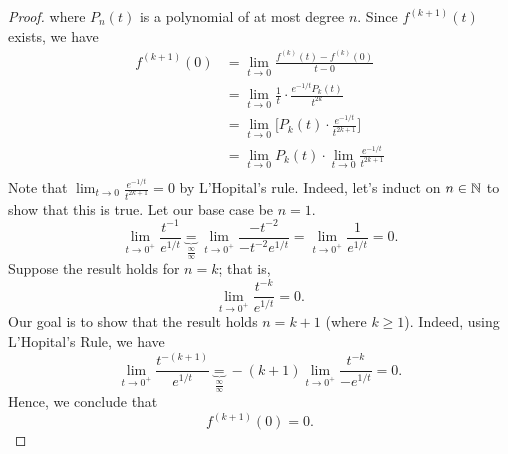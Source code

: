 \documentclass[a4paper]{article}
\begin{document}
\begin{proof}
where \( {P}_{n}(t) \) is a polynomial of at most degree \( n \).
Since \( f^{(k+1)}(t) \) exists, we have 
\begin{align*}
    f^{(k+1)}(0) &= \lim_{ t  \to 0 }  \frac{ f^{(k)}(t) - f^{(k)}(0)  }{t - 0  }  \\
            &= \lim_{ t \to 0 }  \frac{ 1 }{ t }  \cdot \frac{ e^{-1/t} {P}_{k}(t)  }{ t^{2k} } \\
            &= \lim_{ t \to 0  } \Big[ {P}_{k}(t) \cdot \frac{ e^{-1/t} }{ t^{2k+1} } \Big] \\
            &= \lim_{ t \to 0  }  {P}_{k}(t) \cdot \lim_{ t \to 0 }  \frac{ e^{-1/t} }{ t^{2k+1} }  \\
\end{align*}
Note that \( \lim_{ t \to 0  }  \frac{ e^{-1/t} }{ t^{2k+1} }  = 0  \) by L'Hopital's rule. Indeed, let's induct on \( n \in \mathbb{N}  \) to show that this is true. Let our base case be \( n = 1  \).
\[  \lim_{ t \to 0^{+} } \frac{ t^{-1} }{ e^{1/t} } \underbrace{=}_{\frac{ \infty  }{ \infty  }} \lim_{ t \to 0^{+} } \frac{ - t^{-2} }{ - t^{-2} e^{1/t} }  = \lim_{ t \to 0^{+} } \frac{ 1 }{ e^{1/t} }  = 0.    \]
Suppose the result holds for \( n = k   \); that is,  
\[  \lim_{ t \to 0^{+} }  \frac{ t^{-k} }{ e^{1/t} }  = 0.  \]
Our goal is to show that the result holds \( n = k + 1  \) (where \( k \geq 1  \)). Indeed, 
using L'Hopital's Rule, we have
\[  \lim_{ t \to 0^{+} } \frac{ t^{-(k+1)} }{ e^{1/t} } \underbrace{=}_{ \frac{ \infty  }{ \infty  }    } -(k+1)  \lim_{ t \to 0^{+} }  \frac{  t^{-k} }{ -e^{1/t}  } = 0. \] Hence, we conclude that 
\[  f^{(k+1)}(0) = 0. \]
\end{proof}
\end{document}
